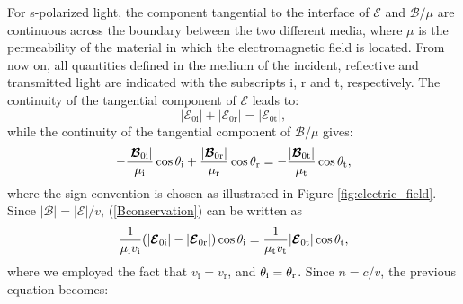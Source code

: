 \indent For s-polarized light, the component tangential to the interface of $\boldsymbol{\mathcal{E}}$ and $\boldsymbol{\mathcal{B}}/\mu$ are continuous across the boundary between the two different media, where $\mu$ is the permeability of the material in which the electromagnetic field is located. From now on, all quantities defined in the medium of the incident, reflective and transmitted light are indicated with the subscripts \textrm{i}, \textrm{r} and \textrm{t}, respectively. The continuity of the tangential component of $\boldsymbol{\mathcal{E}}$ leads to:
\begin{equation}\label{Econservation}
|\boldsymbol{\mathcal{E}}_{0\textrm{i}}|+|\boldsymbol{\mathcal{E}}_{0\textrm{r}}|= |\boldsymbol{\mathcal{E}}_{0\textrm{t}}|,
\end{equation} 
while the continuity of the tangential component of $\boldsymbol{\mathcal{B}}/\mu$ gives:
\begin{equation}\label{Bconservation}
-\frac{|\boldsymbol{\mathcal{B}}_{0\textrm{i}}|}{\mu_\textrm{i}}\cos\theta_{\textrm{i}}+\frac{|\boldsymbol{\mathcal{B}}_{0\textrm{r}}|}{\mu_\textrm{r}}\cos\theta_{\textrm{r}} = 
-\frac{|\boldsymbol{\mathcal{B}}_{0\textrm{t}}|}{\mu_\textrm{t}}\cos\theta_{\textrm{t}},
\end{equation}
where the sign convention is chosen as illustrated in Figure \ref{fig:electric_field}.
Since $|\boldsymbol{\mathcal{B}}| = |\boldsymbol{\mathcal{E}}|/v$, (\ref{Bconservation}) can be written as 
\begin{equation}
\frac{1}{\mu_{\textrm{i}}v_{\textrm{i}}}(|\boldsymbol{\mathcal{E}}_{0\textrm{i}}|-|\boldsymbol{\mathcal{E}}_{0\textrm{r}}|)\cos\theta_{\textrm{i}} = \frac{1}{\mu_{\textrm{t}}v_{\textrm{t}}}|\boldsymbol{\mathcal{E}}_{0\textrm{t}}|\cos\theta_{\textrm{t}},
\end{equation}
where we employed the fact that $v_{\textrm{i}}= v_{\textrm{r}}$, and $\theta_{\textrm{i}}= \theta_{\textrm{r}}$. 
Since $n = c/v$, the previous equation becomes:

